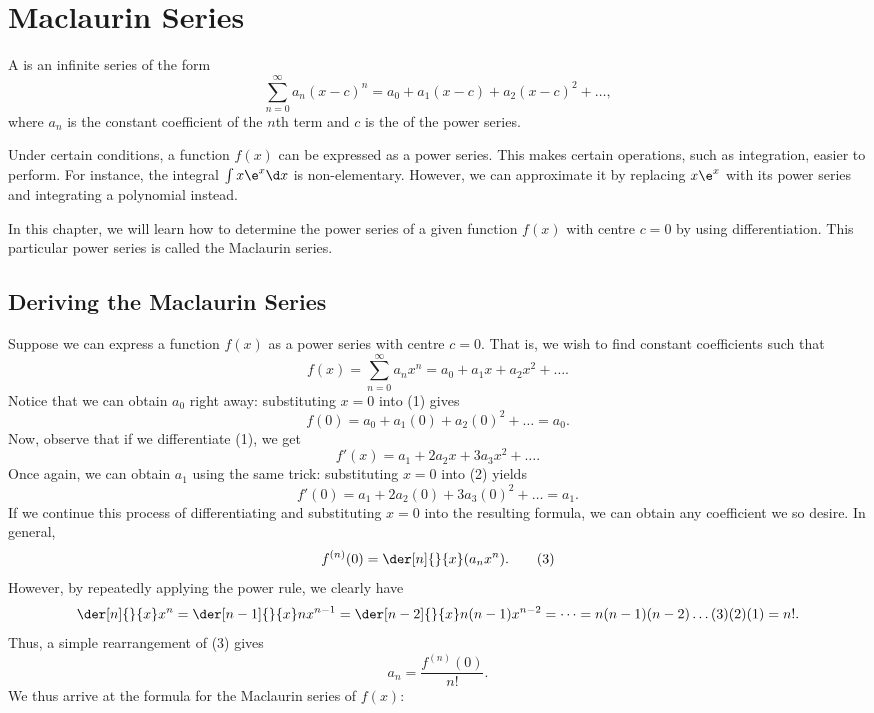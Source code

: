 \chapter{Maclaurin Series}

\begin{definition}
    A  is an infinite series of the form \[\sum_{n=0}^\infty a_n (x-c)^n = a_0 + a_1 (x-c) + a_2 (x-c)^2 + \dots,\] where $a_n$ is the constant coefficient of the $n$th term and $c$ is the  of the power series.
\end{definition}

Under certain conditions, a function $f(x)$ can be expressed as a power series. This makes certain operations, such as integration, easier to perform. For instance, the integral $\int x\e^x \d x$ is non-elementary. However, we can approximate it by replacing $x\e^x$ with its power series and integrating a polynomial instead.

In this chapter, we will learn how to determine the power series of a given function $f(x)$ with centre $c = 0$ by using differentiation. This particular power series is called the Maclaurin series.

\section{Deriving the Maclaurin Series}

Suppose we can express a function $f(x)$ as a power series with centre $c = 0$. That is, we wish to find constant coefficients such that \[f(x) = \sum_{n=0}^\infty a_n x^n = a_0 + a_1 x + a_2 x^2 + \dots. \tag{1}\] Notice that we can obtain $a_0$ right away: substituting $x = 0$ into (1) gives \[f(0) = a_0 + a_1 (0) + a_2 (0)^2 + \dots = a_0.\] Now, observe that if we differentiate (1), we get \[f'(x) = a_1 + 2a_2 x + 3a_3 x^2 + \dots. \tag{2}\] Once again, we can obtain $a_1$ using the same trick: substituting $x = 0$ into (2) yields \[f'(0) = a_1 + 2a_2 (0) + 3a_3 (0)^2 + \dots = a_1.\] If we continue this process of differentiating and substituting $x = 0$ into the resulting formula, we can obtain any coefficient we so desire. In general, \[f^{(n)}(0) = \der[n]{}{x} (a_n x^n). \tag{3}\] However, by repeatedly applying the power rule, we clearly have \[\der[n]{}{x} x^n = \der[n-1]{}{x} nx^{n-1} = \der[n-2]{}{x} n(n-1)x^{n-2} = \dots = n(n-1)(n-2)\dots(3)(2)(1) = n!.\] Thus, a simple rearrangement of (3) gives \[a_n = \frac{f^{(n)}(0)}{n!}.\] We thus arrive at the formula for the Maclaurin series of $f(x)$:

